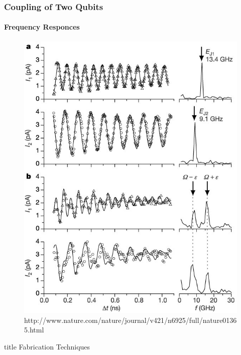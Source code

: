 \documentclass{beamer}
\begin{document}
\begin{frame}
    \frametitle{Coupling of Two Qubits}
    \framesubtitle{Frequency Responces}
    \begin{figure}[ht!]
        \centering
        \includegraphics[height=0.6\textheight]{img/probe-current-osc.jpg}
        \caption{http://www.nature.com/nature/journal/v421/n6925/full/nature01365.html}
    \end{figure}
\end{frame}


\begin{frame}
    \vfill
    \centering
    \begin{beamercolorbox}[sep=8pt,center,shadow=true,rounded=true]{title}
        Fabrication Techniques
    \end{beamercolorbox}
    \vfill
\end{frame}
\end{document}
